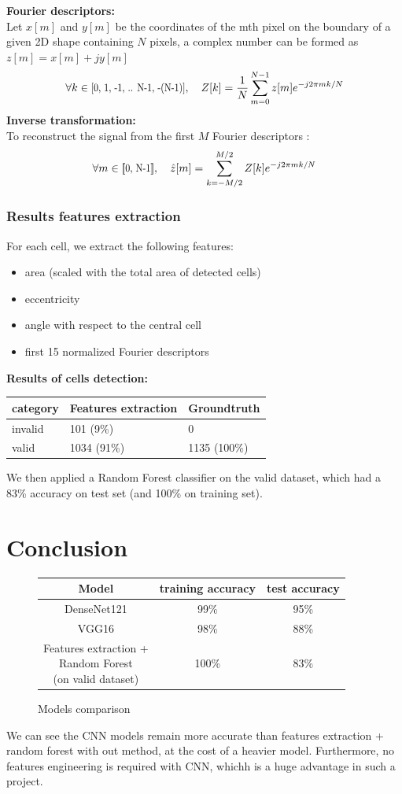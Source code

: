 \documentclass[a4paper]{article}
\begin{document}
\noindent\textbf{Fourier descriptors:}\\
    Let $x[m]$ and $y[m]$ be the coordinates of the mth pixel on the boundary of a given 2D shape containing $N$ pixels, a complex number can be formed as  $z[m]=x[m]+jy[m]$\\
    $$\forall k \in\scalebox{0.85}[1.0]{[0, 1, -1, .. N-1, -(N-1)]}, \quad Z[k] = \frac{1}{N}\displaystyle\sum_{m=0}^{N-1} z[m]e^{-j2\pi mk/N}$$
\textbf{Inverse transformation:}\\
To reconstruct the signal from the first $M$ Fourier descriptors :
    $$\forall m \in \scalebox{0.85}[1.0]{[\![0, N-1]\!]}, \quad \hat{z}[m] = \displaystyle\sum_{k=-M/2}^{M/2} Z[k]e^{-j2\pi mk/N}$$


\subsubsection{Results features extraction}
For each cell, we extract the following features:
    \begin{itemize}
        \item area (scaled with the total area of detected cells)
        \item eccentricity
        \item angle with respect to the central cell
        \item first 15 normalized Fourier descriptors
    \end{itemize}
    \vspace{3pt}
\large{\textbf{Results of cells detection:}}\\
    \vspace{15pt}
\begin{tabular}{ |m{2cm}|m{10em}|m{8em}| }
 \hline
category & Features extraction & Groundtruth \\
\hline
invalid & 101 (9\%) &  0\\
valid & 1034 (91\%)  & 1135 (100\%)\\
\hline
\end{tabular}

We then applied a Random Forest classifier on the valid dataset, which had a 83\% accuracy on test set (and 100\% on training set).

\newpage
\section{Conclusion}

\begin{figure}[h]
    \centering
    \begin{tabular}{ |c|c|c| }
 \hline
Model & training accuracy & test accuracy\\
\hline
DenseNet121& 99\% & 95\%\\
\hline
VGG16& 98\% & 88\%\\
\hline
    \makecell{Features extraction + \\Random Forest \\(on valid dataset)}& 100\% & 83\% \\
\hline
\end{tabular}
\caption{Models comparison}
\end{figure}

We can see the CNN models remain more accurate than features extraction + random forest with out method, at the cost of a heavier model. Furthermore, no features engineering is required with CNN, whichh is a huge advantage in such a project. 
\end{document}
